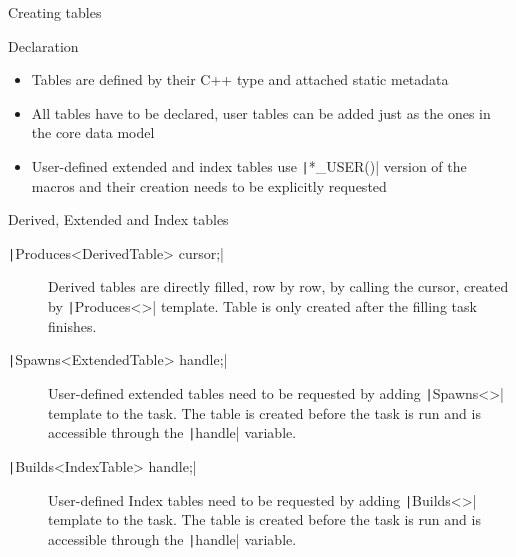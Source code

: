 \documentclass[10pt,lualatex,xcolor={table,svgnames},{hyperref={bookmarks=true,linktoc=all}},aspectratio=169]{beamer}
\newcommand{\codeline}[1]{{\texttt|#1|}}
\begin{document}
\begin{frame}[shrink=3]{Creating tables}
    \vspace{1em}
    \begin{block}{Declaration}
        \begin{itemize}
            \item Tables are defined by their C++ type and attached static metadata
            \item All tables have to be declared, user tables can be added just as the ones in the core data model
            \item User-defined extended and index tables use \codeline{*_USER()} version of the macros and their creation needs to be explicitly requested
        \end{itemize}
    \end{block}
    \begin{block}{Derived, Extended and Index tables}
        \begin{description}
            \item [\codeline{Produces<DerivedTable> cursor;}] Derived tables are directly filled, row by row, by calling the cursor, created by \codeline{Produces<>} template. Table is only created after the filling task finishes.
            \item [\codeline{Spawns<ExtendedTable> handle;}] User-defined extended tables need to be requested by adding \codeline{Spawns<>} template to the task. The table is created before the task is run and is accessible through the \codeline{handle} variable.
            \item [\codeline{Builds<IndexTable> handle;}] User-defined Index tables need to be requested by adding \codeline{Builds<>} template to the task. The table is created before the task is run and is accessible through the \codeline{handle} variable.
        \end{description}
    \end{block}
\end{frame}
\end{document}
